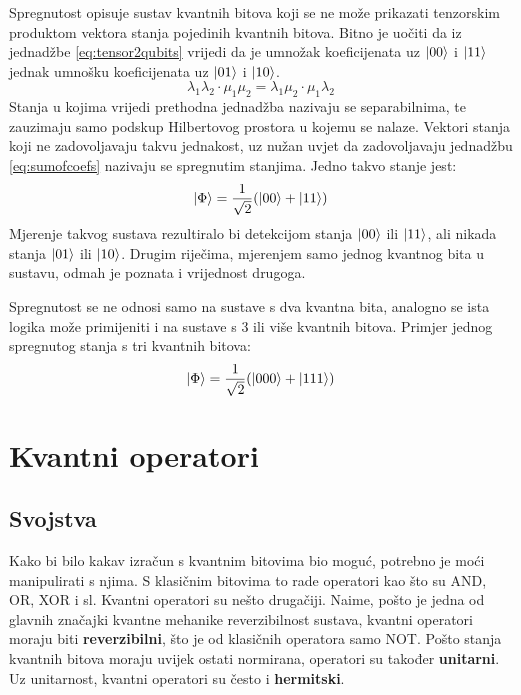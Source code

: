 Spregnutost  opisuje sustav kvantnih bitova koji se ne može prikazati tenzorskim produktom vektora stanja pojedinih kvantnih bitova. Bitno je uočiti da iz jednadžbe \ref{eq:tensor2qubits} vrijedi da je umnožak koeficijenata uz $\ket{00}$ i $\ket{11}$ jednak umnošku koeficijenata uz $\ket{01}$ i $\ket{10}$.
\begin{equation}
\lambda_1\lambda_2 \cdot \mu_1\mu_2 = \lambda_1\mu_2 \cdot \mu_1\lambda_2
\end{equation}
Stanja u kojima vrijedi prethodna jednadžba nazivaju se separabilnima, te zauzimaju samo podskup Hilbertovog prostora u kojemu se nalaze. Vektori stanja koji ne zadovoljavaju takvu jednakost, uz nužan uvjet da zadovoljavaju jednadžbu \ref{eq:sumofcoefs} nazivaju se spregnutim stanjima. Jedno takvo stanje jest:
\begin{equation}
\ket{\Phi} = \frac{1}{\sqrt{2}}(\ket{00} + \ket{11})
\end{equation}
Mjerenje takvog sustava rezultiralo bi detekcijom stanja $\ket{00}$ ili $\ket{11}$, ali nikada  stanja $\ket{01}$ ili $\ket{10}$. Drugim riječima, mjerenjem samo jednog kvantnog bita u sustavu, odmah je poznata i vrijednost drugoga.

Spregnutost se ne odnosi samo na sustave s dva kvantna bita, analogno se ista logika može primijeniti i na sustave s 3 ili više kvantnih bitova. Primjer jednog spregnutog stanja s tri kvantnih bitova:
\begin{equation}
\ket{\Phi} = \frac{1}{\sqrt{2}}(\ket{000} + \ket{111})
\end{equation}




\section{Kvantni operatori}

\subsection{Svojstva}

Kako bi bilo kakav izračun s kvantnim bitovima bio moguć, potrebno je moći manipulirati s njima. S klasičnim bitovima to rade operatori kao što su AND, OR, XOR i sl. Kvantni operatori su nešto drugačiji. Naime, pošto je jedna od glavnih značajki kvantne mehanike reverzibilnost sustava, kvantni operatori moraju biti \textbf{reverzibilni}, što je od klasičnih operatora samo NOT. Pošto stanja kvantnih bitova moraju uvijek ostati normirana, operatori su također \textbf{unitarni}. Uz unitarnost, kvantni operatori su često i \textbf{hermitski}.

